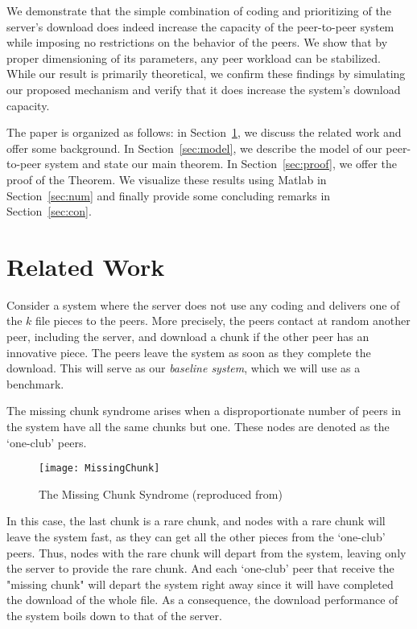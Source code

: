 \documentclass[11pt,conference]{IEEEtran}
\begin{document}
We demonstrate that the simple combination of coding and prioritizing of the server's download does indeed increase the capacity of the peer-to-peer system while imposing no restrictions on the behavior of the peers. We show that by proper dimensioning of its parameters, any peer workload can be stabilized. While our result is primarily theoretical, we confirm these findings by simulating our proposed mechanism and verify that it does increase the system's download capacity.

The paper is organized as follows: in Section~\ref{sec:rel}, we discuss the related work and offer some background. In Section~\ref{sec:model}, we describe the model of our peer-to-peer system and state our main theorem. In Section~\ref{sec:proof}, we offer the proof of the Theorem. We visualize these results using Matlab in Section~\ref{sec:num} and finally provide some concluding remarks in Section~\ref{sec:con}.

\section{Related Work}
\label{sec:rel}

Consider a system where the server does not use any coding and delivers one of the $k$ file pieces to the peers. More precisely, the peers contact at random another peer, including the server, and download a chunk if the other peer has an innovative piece. The peers leave the system as soon as they complete the download. This will serve as our {\em baseline system}, which we will use as a benchmark.

The missing chunk syndrome\cite{Hajek2010Missing}\cite{Mathieu2006Missing} arises when a disproportionate number of peers in the system have all the same chunks but one. These nodes are denoted as the `one-club' peers.

\begin{figure}[!t]
\centering
\texttt{[image: MissingChunk]}
\caption{The Missing Chunk Syndrome (reproduced from\cite{Mathieu2006Missing})}
\label{fig:missing}
\end{figure}

In this case, the last chunk is a rare chunk, and nodes with a rare chunk will leave the system fast, as they can get all the other pieces from the `one-club' peers. Thus, nodes with the rare chunk will depart from the system, leaving only the server to provide the rare chunk. And each `one-club' peer that receive the "missing chunk" will depart the system right away since it will have completed the download of the whole file. As a consequence, the download performance of the system boils down to that of the server.
\end{document}

